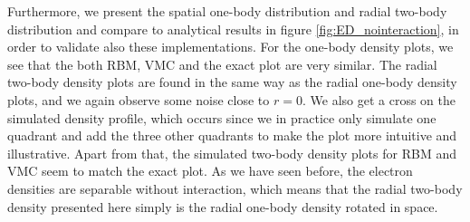 Furthermore, we present the spatial one-body distribution and radial two-body distribution and compare to analytical results in figure \eqref{fig:ED_nointeraction}, in order to validate also these implementations. For the one-body density plots, we see that the both RBM, VMC and the exact plot are very similar. The radial two-body density plots are found in the same way as the radial one-body density plots, and we again observe some noise close to $r=0$. We also get a cross on the simulated density profile, which occurs since we in practice only simulate one quadrant and add the three other quadrants to make the plot more intuitive and illustrative. Apart from that, the simulated two-body density plots for RBM and VMC seem to match the exact plot. As we have seen before, the electron densities are separable without interaction, which means that the radial two-body density presented here simply is the radial one-body density rotated in space. 

